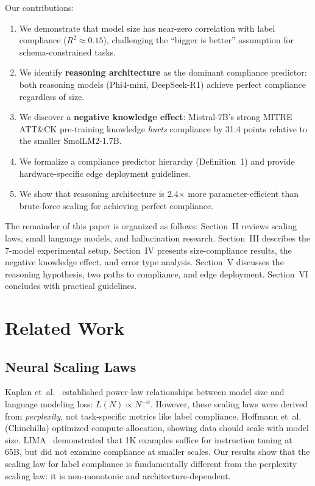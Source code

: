 \documentclass[review,3p]{elsarticle}
\begin{document}
Our contributions:
\begin{enumerate}
\item We demonstrate that model size has near-zero correlation with label compliance ($R^2 \approx 0.15$), challenging the ``bigger is better'' assumption for schema-constrained tasks.
\item We identify \textbf{reasoning architecture} as the dominant compliance predictor: both reasoning models (Phi4-mini, DeepSeek-R1) achieve perfect compliance regardless of size.
\item We discover a \textbf{negative knowledge effect}: Mistral-7B's strong MITRE ATT\&CK pre-training knowledge \emph{hurts} compliance by 31.4 points relative to the smaller SmolLM2-1.7B.
\item We formalize a compliance predictor hierarchy (Definition~1) and provide hardware-specific edge deployment guidelines.
\item We show that reasoning architecture is 2.4$\times$ more parameter-efficient than brute-force scaling for achieving perfect compliance.
\end{enumerate}

The remainder of this paper is organized as follows: Section~II reviews scaling laws, small language models, and hallucination research. Section~III describes the 7-model experimental setup. Section~IV presents size-compliance results, the negative knowledge effect, and error type analysis. Section~V discusses the reasoning hypothesis, two paths to compliance, and edge deployment. Section~VI concludes with practical guidelines.

\section{Related Work}

\subsection{Neural Scaling Laws}
Kaplan et~al.~\cite{kaplan2020} established power-law relationships between model size and language modeling loss: $L(N) \propto N^{-\alpha}$. However, these scaling laws were derived from \emph{perplexity}, not task-specific metrics like label compliance. Hoffmann et~al.~\cite{hoffmann2022} (Chinchilla) optimized compute allocation, showing data should scale with model size. LIMA~\cite{zhou2023} demonstrated that 1K examples suffice for instruction tuning at 65B, but did not examine compliance at smaller scales. Our results show that the scaling law for label compliance is fundamentally different from the perplexity scaling law: it is non-monotonic and architecture-dependent.
\end{document}
